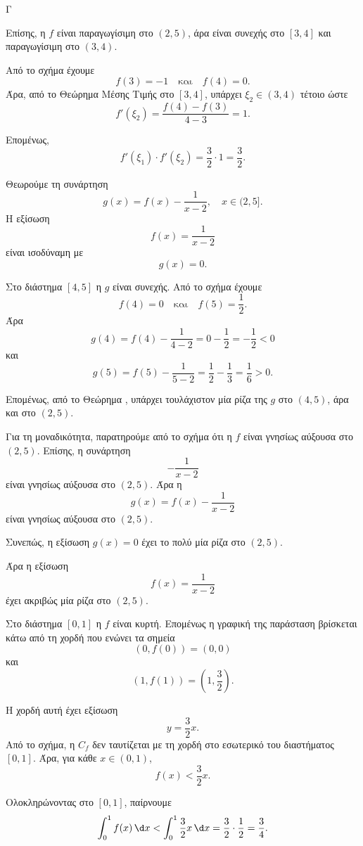 \begin{thema}{Γ}
\begin{erwthma}
Επίσης, η $f$ είναι παραγωγίσιμη στο $(2,5)$, άρα είναι συνεχής στο $[3,4]$ και παραγωγίσιμη στο $(3,4)$.

Από το σχήμα έχουμε
\[
f(3)=-1
\quad \text{και}\quad
f(4)=0.
\]
Άρα, από το Θεώρημα Μέσης Τιμής στο $[3,4]$, υπάρχει $\xi_2\in(3,4)$ τέτοιο ώστε
\[
f'(\xi_2)=\frac{f(4)-f(3)}{4-3}
=1.
\]

Επομένως,
\[
f'(\xi_1)\cdot f'(\xi_2)=\frac{3}{2}\cdot 1=\frac{3}{2}.
\]

\item Θεωρούμε τη συνάρτηση
\[
g(x)=f(x)-\frac{1}{x-2},\quad x\in(2,5].
\]
Η εξίσωση
\[
f(x)=\frac{1}{x-2}
\]
είναι ισοδύναμη με
\[
g(x)=0.
\]

Στο διάστημα $[4,5]$ η $g$ είναι συνεχής. Από το σχήμα έχουμε
\[
f(4)=0
\quad \text{και}\quad
f(5)=\frac{1}{2}.
\]
Άρα
\[
g(4)=f(4)-\frac{1}{4-2}=0-\frac{1}{2}=-\frac{1}{2}<0
\]
και
\[
g(5)=f(5)-\frac{1}{5-2}=\frac{1}{2}-\frac{1}{3}=\frac{1}{6}>0.
\]

Επομένως, από το Θεώρημα , υπάρχει τουλάχιστον μία ρίζα της $g$ στο $(4,5)$, άρα και στο $(2,5)$.

Για τη μοναδικότητα, παρατηρούμε από το σχήμα ότι η $f$ είναι γνησίως αύξουσα στο $(2,5)$. Επίσης, η συνάρτηση
\[
-\frac{1}{x-2}
\]
είναι γνησίως αύξουσα στο $(2,5)$. Άρα η
\[
g(x)=f(x)-\frac{1}{x-2}
\]
είναι γνησίως αύξουσα στο $(2,5)$.

Συνεπώς, η εξίσωση $g(x)=0$ έχει το πολύ μία ρίζα στο $(2,5)$.

Άρα η εξίσωση
\[
f(x)=\frac{1}{x-2}
\]
έχει ακριβώς μία ρίζα στο $(2,5)$.

\item Στο διάστημα $[0,1]$ η $f$ είναι κυρτή. Επομένως η γραφική της παράσταση βρίσκεται κάτω από τη χορδή που ενώνει τα σημεία
\[
(0,f(0))=(0,0)
\]
και
\[
\left(1,f(1)\right)=\left(1,\frac{3}{2}\right).
\]

Η χορδή αυτή έχει εξίσωση
\[
y=\frac{3}{2}x.
\]
Από το σχήμα, η $C_f$ δεν ταυτίζεται με τη χορδή στο εσωτερικό του διαστήματος $[0,1]$. Άρα, για κάθε $x\in(0,1)$,
\[
f(x)<\frac{3}{2}x.
\]

Ολοκληρώνοντας στο $[0,1]$, παίρνουμε
\[
\int_0^1 f(x)\,\d x
<
\int_0^1 \frac{3}{2}x\,\d x
=\frac{3}{2}\cdot \frac{1}{2}
=\frac{3}{4}.
\]
\end{erwthma}
\end{thema}

